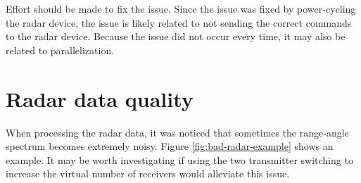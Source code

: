 Effort should be made to fix the issue.
Since the issue was fixed by power-cycling the radar device,
the issue is likely related to not sending the correct commands to the radar device.
Because the issue did not occur every time,
it may also be related to parallelization.

\section{Radar data quality}
\label{sec:5-radar-spectrum-issues}
When processing the radar data, it was noticed that sometimes the range-angle spectrum
becomes extremely noisy. Figure \ref{fig:bad-radar-example} shows an example.
It may be worth investigating if using the two transmitter switching to increase the virtual number of receivers would alleviate this issue.

